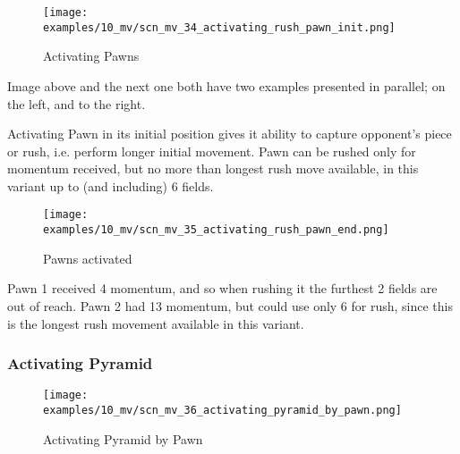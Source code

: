 \vspace*{-1.4\baselineskip}
\noindent
\begin{figure}[!h]
\texttt{[image: examples/10\_mv/scn\_mv\_34\_activating\_rush\_pawn\_init.png]}
\vspace*{-1.3\baselineskip}
\caption{Activating Pawns}
\label{fig:scn_mv_34_activating_rush_pawn_init}
\end{figure}

\vspace*{-0.3\baselineskip}
Image above and the next one both have two examples presented in parallel; on the left,
and to the right.

Activating Pawn in its initial position gives it ability to capture opponent's
piece or rush, i.e. perform longer initial movement. Pawn can be rushed only for
momentum received, but no more than longest rush move available, in this variant
up to (and including) 6 fields.

\clearpage %

\vspace*{-2.1\baselineskip}
\noindent
\begin{figure}[!h]
\texttt{[image: examples/10\_mv/scn\_mv\_35\_activating\_rush\_pawn\_end.png]}
\caption{Pawns activated}
\label{fig:scn_mv_35_activating_rush_pawn_end}
\end{figure}

Pawn 1 received 4 momentum, and so when rushing it the furthest 2 fields are out
of reach. Pawn 2 had 13 momentum, but could use only 6 for rush, since this is the
longest rush movement available in this variant.

\clearpage %

\subsubsection*{Activating Pyramid}
\label{sec:Miranda's veil/Wave/Cascading Waves/Activating Pyramid}

\vspace*{-1.4\baselineskip}
\noindent
\begin{figure}[!h]
\texttt{[image: examples/10\_mv/scn\_mv\_36\_activating\_pyramid\_by\_pawn.png]}
\vspace*{-1.3\baselineskip}
\caption{Activating Pyramid by Pawn}
\label{fig:scn_mv_36_activating_pyramid_by_pawn}
\end{figure}

